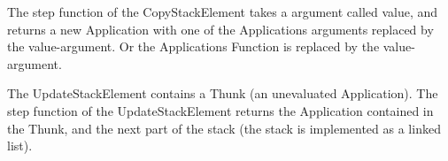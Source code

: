 The step function of the CopyStackElement takes a argument called value,
and returns a new Application with one of the Applications arguments
replaced by the value-argument. Or the Applications Function is replaced
by the value-argument.

The UpdateStackElement contains a Thunk (an unevaluated Application).
The step function of the UpdateStackElement returns the Application contained
in the Thunk, and the next part of the stack (the stack is implemented as a
linked list).

